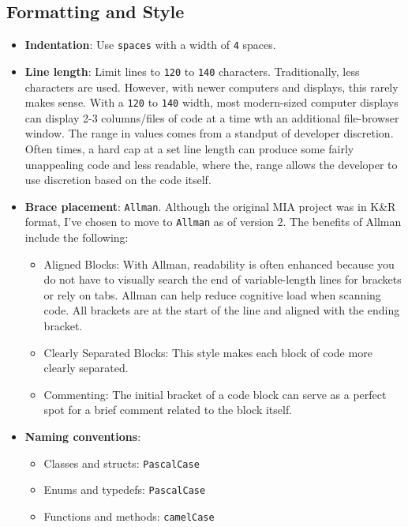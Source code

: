 \subsection{Formatting and Style}
\begin{itemize}\itemsep0em
    \item \textbf{Indentation}: Use \texttt{spaces} with a width of \texttt{4} spaces.
    \item \textbf{Line length}: Limit lines to \texttt{120} to \texttt{140} characters. Traditionally, less characters are used. However, with newer computers and displays, this rarely makes sense. With a \texttt{120} to \texttt{140} width, most modern-sized computer displays can display 2-3 columns/files of code at a time wth an additional file-browser window. The range in values comes from a standput of developer discretion. Often times, a hard cap at a set line length can produce some fairly unappealing code and less readable, where the, range allows the developer to use discretion based on the code itself. 
    \item \textbf{Brace placement}: \texttt{Allman}. Although the original MIA project was in K\&R format, I've chosen to move to \texttt{Allman} as of version 2. The benefits of Allman include the following:    
    \begin{itemize}\itemsep0em
        \item Aligned Blocks: With Allman, readability is often enhanced because you do not have to visually search the end of variable-length lines for brackets or rely on tabs. Allman can help reduce cognitive load when scanning code. All brackets are at the start of the line and aligned with the ending bracket. 
        \item Clearly Separated Blocks: This style makes each block of code more clearly separated.
        \item Commenting: The initial bracket of a code block can serve as a perfect spot for a brief comment related to the block itself. 
    \end{itemize}
    \item \textbf{Naming conventions}:
    \begin{itemize}\itemsep0em
        \item Classes and structs: \texttt{PascalCase}
        \item Enums and typedefs: \texttt{PascalCase}
        \item Functions and methods: \texttt{camelCase}
        \begin{itemize}

\end{itemize}
\end{itemize}
\end{itemize}
